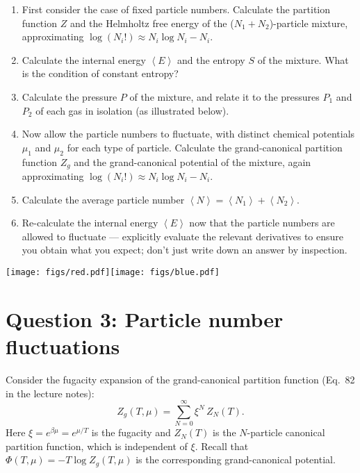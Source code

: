 \documentclass[12 pt]{article} %
\newcommand{\be}{\ensuremath{\beta} }
\newcommand{\vev}[1]{\ensuremath{\left\langle #1 \right\rangle} }
\newcommand{\showmarks}[1]{\rightline{\texttt{[#1 marks]}}} %
\begin{document}
\begin{enumerate}[label={(\alph*)}]
  \item First consider the case of fixed particle numbers.
        Calculate the partition function $Z$ and the Helmholtz free energy of the ($N_1 + N_2$)-particle mixture, approximating $\log(N_i!) \approx N_i\log N_i - N_i$.

  \showmarks{4}

  \item Calculate the internal energy $\vev{E}$ and the entropy $S$ of the mixture.
        What is the condition of constant entropy?

  \showmarks{4}

  \item Calculate the pressure $P$ of the mixture, and relate it to the pressures $P_1$ and $P_2$ of each gas in isolation (as illustrated below).

  \showmarks{4}

  \item Now allow the particle numbers to fluctuate, with distinct chemical potentials $\mu_1$ and $\mu_2$ for each type of particle.
        Calculate the grand-canonical partition function $Z_g$ and the grand-canonical potential of the mixture, again approximating $\log(N_i!) \approx N_i\log N_i - N_i$.

  \showmarks{4}

  \item Calculate the average particle number $\vev{N} = \vev{N_1} + \vev{N_2}$.

  \showmarks{5}

  \item Re-calculate the internal energy $\vev{E}$ now that the particle numbers are allowed to fluctuate --- explicitly evaluate the relevant derivatives to ensure you obtain what you expect; don't just write down an answer by inspection.

  \showmarks{5}
\end{enumerate}

\begin{center}\texttt{[image: figs/red.pdf]}\hspace{0.3\textwidth}\texttt{[image: figs/blue.pdf]}\end{center}



\newpage
\section*{Question 3: Particle number fluctuations}
Consider the fugacity expansion of the grand-canonical partition function (Eq.~82 in the lecture notes):
\begin{equation*}
  Z_g(T, \mu) = \sum_{N = 0}^{\infty} \xi^N \, Z_N(T).
\end{equation*}
Here $\xi = e^{\be \mu} = e^{\mu / T}$ is the fugacity and $Z_N(T)$ is the $N$-particle canonical partition function, which is independent of $\xi$.
Recall that $\Phi(T, \mu) = -T \log Z_g(T, \mu)$ is the corresponding grand-canonical potential.
\end{document}

